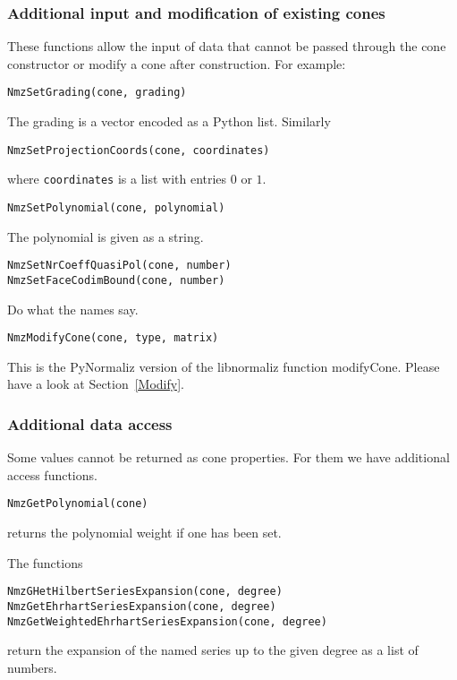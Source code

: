 \begin{small}
\subsubsection{Additional input and modification of existing cones}

These functions allow the input of data that cannot be passed through the cone constructor or modify a cone after construction. For example:
\begin{Verbatim}
NmzSetGrading(cone, grading)
\end{Verbatim}
The grading is a vector encoded as a Python list. Similarly
\begin{Verbatim}
NmzSetProjectionCoords(cone, coordinates)
\end{Verbatim}
where \verb|coordinates| is a list with entries $0$ or $1$.

\begin{Verbatim}
NmzSetPolynomial(cone, polynomial)
\end{Verbatim}
The polynomial is given as a string.

\begin{Verbatim}
NmzSetNrCoeffQuasiPol(cone, number)
NmzSetFaceCodimBound(cone, number)
\end{Verbatim}
Do what the names say.

\begin{Verbatim}
NmzModifyCone(cone, type, matrix)
\end{Verbatim}
This is the PyNormaliz version of the libnormaliz function modifyCone. Please have a look at Section~\ref{Modify}.

\subsubsection{Additional data access}\label{add_data}

Some values cannot be returned as cone properties. For them we have additional access functions.

\begin{Verbatim}
NmzGetPolynomial(cone)
\end{Verbatim}
returns the polynomial weight if one has been set.

The functions
\begin{Verbatim}
NmzGHetHilbertSeriesExpansion(cone, degree)
NmzGetEhrhartSeriesExpansion(cone, degree)
NmzGetWeightedEhrhartSeriesExpansion(cone, degree)
\end{Verbatim}
return the expansion of the named series up to the given degree as a list of numbers.


\end{small}
